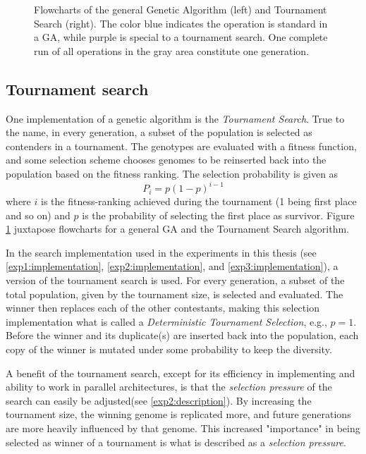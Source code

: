 \begin{figure}[ht]
\begin{subfigure}[ht]{0.25\linewidth}
    \end{subfigure}
    \caption[Algorithm flowcharts]{Flowcharts of the general Genetic Algorithm (left) and Tournament Search (right). The color blue indicates the operation is standard in a GA, while purple is special to a tournament search. One complete run of all operations in the gray area constitute one generation.}
    \label{fig:algorithmflowcharts}
\end{figure}

\subsection{Tournament search}
One implementation of a genetic algorithm is the \textit{Tournament Search}. True to the name, in every generation, a subset of the population is selected as contenders in a tournament. The genotypes are evaluated with a fitness function, and some selection scheme chooses genomes to be reinserted back into the population based on the fitness ranking. The selection probability is given as 
\begin{equation}
    \label{eq:tournamentsearch}
    P_{i} = p(1-p)^{i-1}
\end{equation}
where \(i\) is the fitness-ranking achieved during the tournament (1 being first place and so on) and \(p\) is the probability of selecting the first place as survivor. Figure \ref{fig:algorithmflowcharts} juxtapose flowcharts for a general GA and the Tournament Search algorithm. 

In the search implementation used in the experiments in this thesis (see \ref{exp1:implementation}, \ref{exp2:implementation}, and \ref{exp3:implementation}), a version of the tournament search is used. For every generation, a subset of the total population, given by the tournament size, is selected and evaluated. The winner then replaces each of the other contestants, making this selection implementation what is called a \textit{Deterministic Tournament Selection}, e.g., \(p=1\). Before the winner and its duplicate(s) are inserted back into the population, each copy of the winner is mutated under some probability to keep the diversity. 

A benefit of the tournament search, except for its efficiency in implementing and ability to work in parallel architectures, is that the \textit{selection pressure} of the search can easily be adjusted(see \ref{exp2:description}). By increasing the tournament size, the winning genome is replicated more, and future generations are more heavily influenced by that genome. This increased "importance" in being selected as winner of a tournament is what is described as a \textit{selection pressure}.

